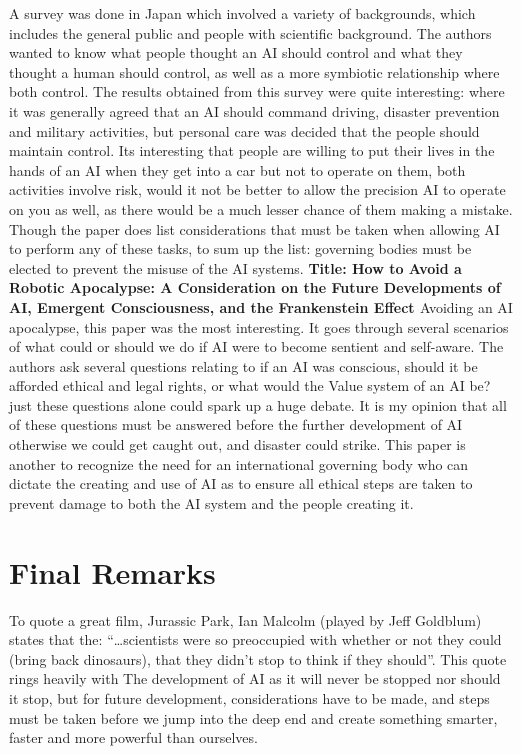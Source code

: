 \documentclass{scrartcl}
\begin{document}
A survey was done in Japan which involved a variety of backgrounds, which includes the general public and people with scientific background. The authors wanted to know what people thought an AI should control and what they thought a human should control, as well as a more symbiotic relationship where both control. The results obtained from this survey were quite interesting: where it was generally agreed that an AI should command driving, disaster prevention and military activities, but personal care was decided that the people should maintain control. Its interesting that people are willing to put their lives in the hands of an AI when they get into a car but not to operate on them, both activities involve risk, would it not be better to allow the precision AI to operate on you as well, as there would be a much lesser chance of them making a mistake. Though the paper does list considerations that must be taken when allowing AI to perform any of these tasks, to sum up the list: governing bodies must be elected to prevent the misuse of the AI systems. 
	\newline
	\newline
	\newline
	\textbf{Title: How to Avoid a Robotic Apocalypse: A Consideration on the Future Developments of AI, Emergent Consciousness, and the Frankenstein Effect \cite{Apocalypse}}
	\newline
Avoiding an AI apocalypse, this paper was the most interesting. It goes through several scenarios of what could or should we do if AI were to become sentient and self-aware. The authors ask several questions relating to if an AI was conscious, should it be afforded ethical and legal rights, or what would the Value system of an AI be? just these questions alone could spark up a huge debate. It is my opinion that all of these questions must be answered before the further development of AI otherwise we could get caught out, and disaster could strike. This paper is another to recognize the need for an international governing body who can dictate the creating and use of AI as to ensure all ethical steps are taken to prevent damage to both the AI system and the people creating it. 

\section{Final Remarks}
To quote a great film, Jurassic Park, Ian Malcolm (played by Jeff Goldblum) states that the: “…scientists were so preoccupied with whether or not they could (bring back dinosaurs), that they didn't stop to think if they should”\cite{Park}. This quote rings heavily with The development of AI as it will never be stopped nor should it stop, but for future development, considerations have to be made, and steps must be taken before we jump into the deep end and create something smarter, faster and more powerful than ourselves.
	
	
	
	
	
	
\end{document}
